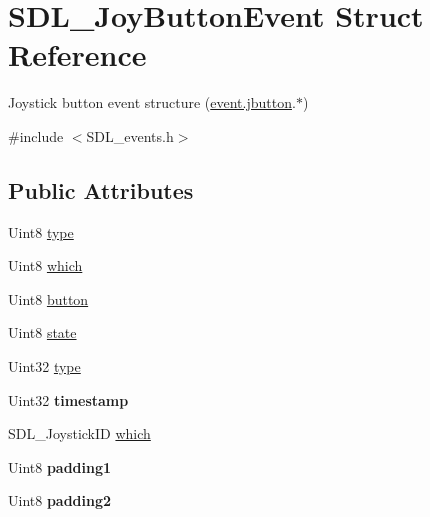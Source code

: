 \hypertarget{structSDL__JoyButtonEvent}{\section{S\+D\+L\+\_\+\+Joy\+Button\+Event Struct Reference}
\label{structSDL__JoyButtonEvent}
}


Joystick button event structure (\hyperlink{unionSDL__Event_a591104d64903ae1cf70874fb5d3124ff}{event.\+jbutton}.$\ast$)  




{\ttfamily \#include $<$S\+D\+L\+\_\+events.\+h$>$}

\subsection*{Public Attributes}
\begin{DoxyCompactItemize}
\item 
Uint8 \hyperlink{structSDL__JoyButtonEvent_a8f3312a046d37fa2884b93f69c4cb655}{type}
\item 
Uint8 \hyperlink{structSDL__JoyButtonEvent_a1679049adad7242b28420948fdc79044}{which}
\item 
Uint8 \hyperlink{structSDL__JoyButtonEvent_a73ebe4261cf80564052af9c1af737a4d}{button}
\item 
Uint8 \hyperlink{structSDL__JoyButtonEvent_ad3b6f8d9aa2c5e694f664b97d12bcd2b}{state}
\item 
Uint32 \hyperlink{structSDL__JoyButtonEvent_a8f3312a046d37fa2884b93f69c4cb655}{type}
\item 
\hypertarget{structSDL__JoyButtonEvent_ab50b6f7d1ab3ac53df69fc2d6cf5fa2a}{Uint32 {\bfseries timestamp}}\label{structSDL__JoyButtonEvent_ab50b6f7d1ab3ac53df69fc2d6cf5fa2a}

\item 
S\+D\+L\+\_\+\+Joystick\+I\+D \hyperlink{structSDL__JoyButtonEvent_a1679049adad7242b28420948fdc79044}{which}
\item 
\hypertarget{structSDL__JoyButtonEvent_a3e7ca473fb7783d755d64598529b1ff9}{Uint8 {\bfseries padding1}}\label{structSDL__JoyButtonEvent_a3e7ca473fb7783d755d64598529b1ff9}

\item 
\hypertarget{structSDL__JoyButtonEvent_a77a78bee38f4bf0682ccd97bbf8f9ab9}{Uint8 {\bfseries padding2}}\label{structSDL__JoyButtonEvent_a77a78bee38f4bf0682ccd97bbf8f9ab9}

\end{DoxyCompactItemize}


